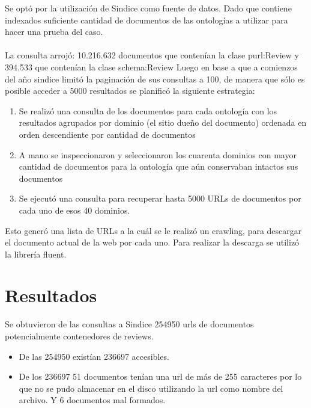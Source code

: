 Se optó por la utilización de Sindice como fuente de datos. Dado que contiene indexados suficiente cantidad de documentos de las 
ontologías a utilizar para hacer una prueba del caso.
\\\\
La consulta arrojó: 10.216.632 documentos que contenían la clase purl:Review y 394.533 que contenían la clase schema:Review
Luego en base a que a comienzos del año sindice limitó la paginación de sus consultas a 100, de manera que sólo es posible acceder a 5000 
resultados se planificó la siguiente estrategia:
\begin{enumerate}
 \item Se realizó una consulta de los documentos para cada ontología con los resultados agrupados por dominio (el sitio dueño del documento) ordenada en orden descendiente por cantidad de documentos 
 \item A mano se inspeccionaron y seleccionaron los cuarenta dominios con mayor cantidad de documentos para la ontología que aún conservaban intactos sus documentos
 \item Se ejecutó una consulta para recuperar hasta 5000 URLs de documentos por cada uno de esos 40 dominios.
\end{enumerate}

\noindent Esto generó una lista de URLs a la cuál se le realizó un crawling, para descargar el documento actual de la web por cada uno. Para realizar la descarga se utilizó la librería fluent.

\section{Resultados}
\label{section:recoleccion-resultados}

\noindent Se obtuvieron de las consultas a Sindice 254950 urls de documentos potencialmente contenedores de reviews.
\begin{itemize}
 \item De las 254950 existían 236697 accesibles.
 \item De los 236697 51 documentos tenían una url de más de 255 caracteres por lo que no se pudo almacenar en el disco utilizando la url como nombre del archivo. Y 6 documentos mal formados.
\end{itemize}


